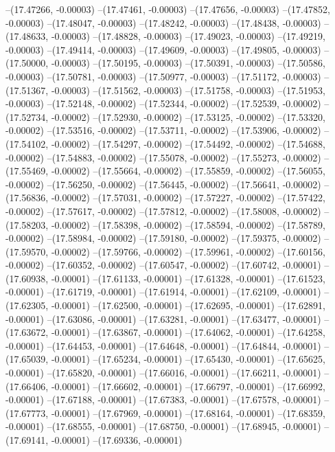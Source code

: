 --(17.47266, -0.00003)
--(17.47461, -0.00003)
--(17.47656, -0.00003)
--(17.47852, -0.00003)
--(17.48047, -0.00003)
--(17.48242, -0.00003)
--(17.48438, -0.00003)
--(17.48633, -0.00003)
--(17.48828, -0.00003)
--(17.49023, -0.00003)
--(17.49219, -0.00003)
--(17.49414, -0.00003)
--(17.49609, -0.00003)
--(17.49805, -0.00003)
--(17.50000, -0.00003)
--(17.50195, -0.00003)
--(17.50391, -0.00003)
--(17.50586, -0.00003)
--(17.50781, -0.00003)
--(17.50977, -0.00003)
--(17.51172, -0.00003)
--(17.51367, -0.00003)
--(17.51562, -0.00003)
--(17.51758, -0.00003)
--(17.51953, -0.00003)
--(17.52148, -0.00002)
--(17.52344, -0.00002)
--(17.52539, -0.00002)
--(17.52734, -0.00002)
--(17.52930, -0.00002)
--(17.53125, -0.00002)
--(17.53320, -0.00002)
--(17.53516, -0.00002)
--(17.53711, -0.00002)
--(17.53906, -0.00002)
--(17.54102, -0.00002)
--(17.54297, -0.00002)
--(17.54492, -0.00002)
--(17.54688, -0.00002)
--(17.54883, -0.00002)
--(17.55078, -0.00002)
--(17.55273, -0.00002)
--(17.55469, -0.00002)
--(17.55664, -0.00002)
--(17.55859, -0.00002)
--(17.56055, -0.00002)
--(17.56250, -0.00002)
--(17.56445, -0.00002)
--(17.56641, -0.00002)
--(17.56836, -0.00002)
--(17.57031, -0.00002)
--(17.57227, -0.00002)
--(17.57422, -0.00002)
--(17.57617, -0.00002)
--(17.57812, -0.00002)
--(17.58008, -0.00002)
--(17.58203, -0.00002)
--(17.58398, -0.00002)
--(17.58594, -0.00002)
--(17.58789, -0.00002)
--(17.58984, -0.00002)
--(17.59180, -0.00002)
--(17.59375, -0.00002)
--(17.59570, -0.00002)
--(17.59766, -0.00002)
--(17.59961, -0.00002)
--(17.60156, -0.00002)
--(17.60352, -0.00002)
--(17.60547, -0.00002)
--(17.60742, -0.00001)
--(17.60938, -0.00001)
--(17.61133, -0.00001)
--(17.61328, -0.00001)
--(17.61523, -0.00001)
--(17.61719, -0.00001)
--(17.61914, -0.00001)
--(17.62109, -0.00001)
--(17.62305, -0.00001)
--(17.62500, -0.00001)
--(17.62695, -0.00001)
--(17.62891, -0.00001)
--(17.63086, -0.00001)
--(17.63281, -0.00001)
--(17.63477, -0.00001)
--(17.63672, -0.00001)
--(17.63867, -0.00001)
--(17.64062, -0.00001)
--(17.64258, -0.00001)
--(17.64453, -0.00001)
--(17.64648, -0.00001)
--(17.64844, -0.00001)
--(17.65039, -0.00001)
--(17.65234, -0.00001)
--(17.65430, -0.00001)
--(17.65625, -0.00001)
--(17.65820, -0.00001)
--(17.66016, -0.00001)
--(17.66211, -0.00001)
--(17.66406, -0.00001)
--(17.66602, -0.00001)
--(17.66797, -0.00001)
--(17.66992, -0.00001)
--(17.67188, -0.00001)
--(17.67383, -0.00001)
--(17.67578, -0.00001)
--(17.67773, -0.00001)
--(17.67969, -0.00001)
--(17.68164, -0.00001)
--(17.68359, -0.00001)
--(17.68555, -0.00001)
--(17.68750, -0.00001)
--(17.68945, -0.00001)
--(17.69141, -0.00001)
--(17.69336, -0.00001)
